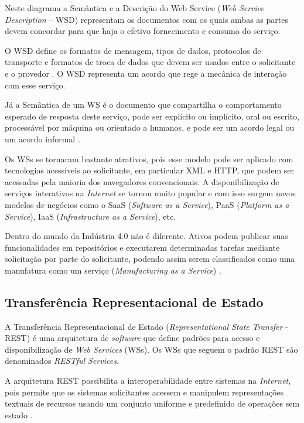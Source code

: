 	Neste diagrama a Semântica e a Descrição do Web Service (\textit{Web Service Description} -- WSD) representam os documentos com os quais ambas as partes devem concordar para que haja o efetivo fornecimento e consumo do serviço.
	
	O WSD define os formatos de mensagem, tipos de dados, protocolos de transporte e formatos de troca de dados que devem ser usados entre o solicitante e o provedor \cite{booth2004webservice}. O WSD representa um acordo que rege a mecânica de interação com esse serviço.
	
	Já a Semântica de um WS é o documento que compartilha o comportamento esperado de resposta deste serviço, pode ser explícito ou implícito, oral ou escrito, processável por máquina ou orientado a humanos, e pode ser um acordo legal ou um acordo informal \cite{booth2004webservice}.

	Os WSs se tornaram bastante atrativos, pois esse modelo pode ser aplicado com tecnologias acessíveis ao solicitante, em particular XML e HTTP, que podem ser acessadas pela maioria dos navegadores convencionais. A disponibilização de serviços interativos na \textit{Internet} se tornou muito popular e com isso surgem novos modelos de negócios como o SaaS (\textit{Software as a Service}), PaaS (\textit{Platform as a Service}), IaaS (\textit{Infrastructure as a Service}), etc.
	
	Dentro do mundo da Indústria 4.0 não é diferente. Ativos podem publicar suas funcionalidades em repositórios e executarem determinadas tarefas mediante solicitação por parte do solicitante, podendo assim serem classificados como uma manufatura como um serviço (\textit{Manufacturing as a Service}) \cite{annunziata2019maas, nichols2020maas, siepen2019maas}.
	
	\subsection{Transferência Representacional de Estado}
	
	A Transferência Representacional de Estado (\textit{Representational State Transfer} - REST) é uma arquitetura de \textit{software} que define padrões para acesso e disponibilização de \textit{Web Services} (WSs). Os WSs que seguem o padrão REST são denominados \textit{RESTful Services}.
	
	A arquitetura REST possibilita a interoperabilidade entre sistemas na \textit{Internet}, pois permite que os sistemas solicitantes acessem e manipulem representações textuais de recursos usando um conjunto uniforme e predefinido de operações sem estado \cite{ferris2004webservices}.
	
